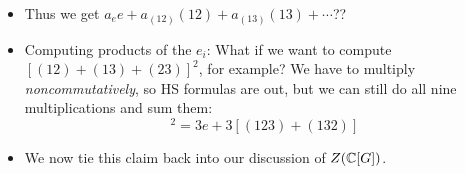 \documentclass[../notes.tex]{subfiles}
\begin{document}
\begin{itemize}
\begin{proof}
\begin{align*}
            xe_ix^{-1} &= \sum_{g\in C_i}xgx^{-1} = \sum_{h\in C_i}h = e_i\\
            xe_i &= e_ix
        \end{align*}
        This naturally extends to any sums and scalar multiples of the $e_i$'s.\par
        \underline{$Z(G)\subset\inp{e_1,\dots,e_k}$}: Let $a\in Z(G)$ be arbitrary. As an element of $\C[G]$, we know that $a=\sum a_gg$ for some $a_g\in\C$. Additionally, since $a\in Z(G)$, we have that $xax^{-1}=a$ for all $x\in G$. Combining these last two results, we have that
        \begin{equation*}
            \sum_{g\in G}a_{x^{-1}gx}g = \sum_{g\in G}a_gxgx^{-1}
            = xax^{-1}
            = a
            = \sum_{g\in G}a_gg
        \end{equation*}
        Comparing like terms in the above equality, we can learn that for all $x\in G$, we have $a_{x^{-1}gx}=a_g$. In other words, all of the $a_g$'s for $g$'s in the same conjugacy class are equal. Therefore, $a$ is of the form $a=\sum_{i=1}^ka_{g_i}e_i$ for $g_i\in C_i$.
    \end{proof}
    \item Thus we get $a_ee+a_{(12)}(12)+a_{(13)}(13)+\cdots$??
    \item Computing products of the $e_i$: What if we want to compute $[(12)+(13)+(23)]^2$, for example? We have to multiply \emph{noncommutatively}, so HS formulas are out, but we can still do all nine multiplications and sum them:
    \begin{equation*}
        [(12)+(13)+(23)]^2 = 3e+3[(123)+(132)]
    \end{equation*}
    \item We now tie this claim back into our discussion of $Z(\mathbb{C}[G])$.

\end{itemize}
\end{document}
